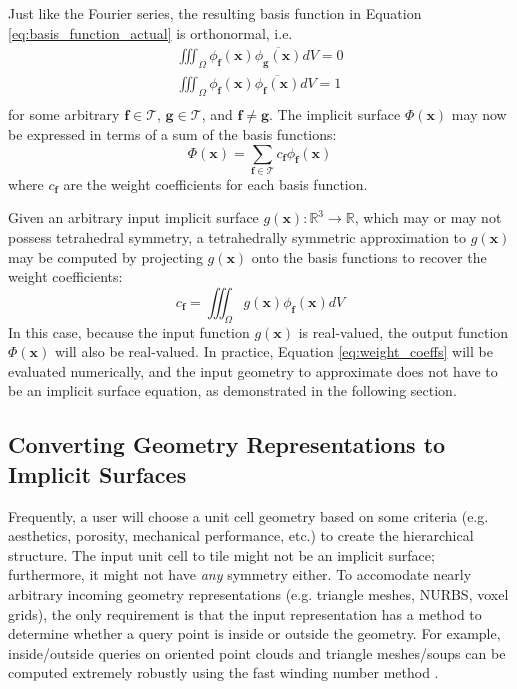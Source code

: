 \documentclass[acmtog]{acmart}
\begin{document}
Just like the Fourier series, the resulting basis function in Equation \ref{eq:basis_function_actual} is orthonormal, i.e.
%
\begin{equation}
  \begin{split}
    \iiint_{\Omega} \phi_{\mathbf{f}}(\mathbf{x}) \overline{\phi_{\mathbf{g}}(\mathbf{x})} dV = 0 \\
    \iiint_{\Omega} \phi_{\mathbf{f}}(\mathbf{x}) \overline{\phi_{\mathbf{f}}(\mathbf{x})} dV = 1 \\
  \end{split}
\end{equation}
%
for some arbitrary $\mathbf{f} \in \mathcal{T}$, $\mathbf{g} \in \mathcal{T}$, and $\mathbf{f} \neq \mathbf{g}$. The implicit surface $\Phi(\mathbf{x})$ may now be expressed in terms of a sum of the basis functions:
%
\begin{equation}
  \Phi(\mathbf{x}) = \sum\limits_{\mathbf{f} \in \mathcal{T}} c_{\mathbf{f}} \phi_{\mathbf{f}}(\mathbf{x})
\end{equation}
%
where $c_{\mathbf{f}}$ are the weight coefficients for each basis function.

Given an arbitrary input implicit surface $g(\mathbf{x}): \mathbb{R}^3 \rightarrow \mathbb{R}$, which may or may not possess tetrahedral symmetry, a tetrahedrally symmetric approximation to $g(\mathbf{x})$ may be computed by projecting $g(\mathbf{x})$ onto the basis functions to recover the weight coefficients:
%
\begin{equation}
  \label{eq:weight_coeffs}
  c_{\mathbf{f}} = \iiint_{\Omega} g(\mathbf{x}) \phi_{\mathbf{f}}(\mathbf{x}) dV
\end{equation}
%
In this case, because the input function $g(\mathbf{x})$ is real-valued, the output function $\Phi(\mathbf{x})$ will also be real-valued. In practice, Equation \ref{eq:weight_coeffs} will be evaluated numerically, and the input geometry to approximate does not have to be an implicit surface equation, as demonstrated in the following section.

\subsection{Converting Geometry Representations to Implicit Surfaces}

Frequently, a user will choose a unit cell geometry based on some criteria (e.g. aesthetics, porosity, mechanical performance, etc.) to create the hierarchical structure. The input unit cell to tile might not be an implicit surface; furthermore, it might not have \textit{any} symmetry either. To accomodate nearly arbitrary incoming geometry representations (e.g. triangle meshes, NURBS, voxel grids), the only requirement is that the input representation has a method to determine whether a query point is inside or outside the geometry. For example, inside/outside queries on oriented point clouds and triangle meshes/soups can be computed extremely robustly using the fast winding number method \cite{barill2018fast}.
\end{document}
